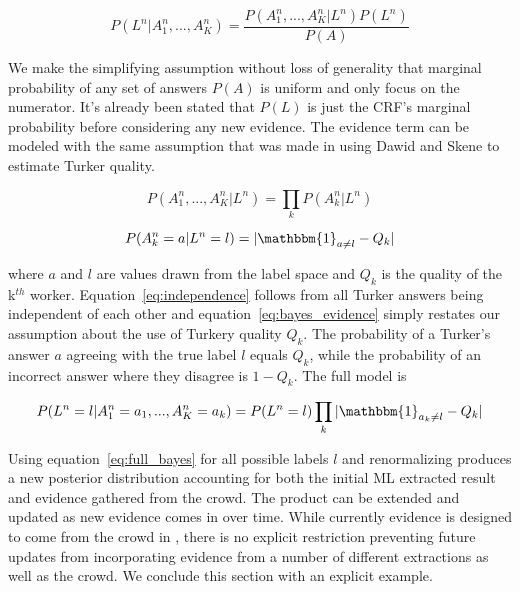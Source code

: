 \begin{equation}
P(L^{n}|A^{n}_{1},...,A^{n}_{K}) = \frac{P(A^{n}_{1},...,A^{n}_{K}|L^{n})P(L^{n})}{P(A)}
\end{equation}

We make the simplifying assumption without loss of generality that marginal probability of any set of answers $P(A)$ is uniform and only focus on the numerator.  It's already been stated that $P(L)$ is just the CRF's marginal probability before considering any new evidence.  The evidence term can be modeled with the same assumption that was made in using Dawid and Skene to estimate Turker quality.

\begin{equation}
\label{eq:independence}
P(A^{n}_{1},...,A^{n}_{K}|L^{n}) = \prod_{k}P(A^{n}_{k}|L^{n})
\end{equation}

\begin{equation}
\label{eq:bayes_evidence}
P(A^{n}_{k}=a|L^{n}=l) = |\mathbbm{1}_{{a}\neq l} - Q_{k}|
\end{equation}

where $a$ and $l$ are values drawn from the label space and $Q_{k}$ is the quality of the k$^{th}$ worker.  Equation~\ref{eq:independence} follows from all Turker answers being independent of each other and equation~\ref{eq:bayes_evidence} simply restates our assumption about the use of Turkery quality $Q_{k}$.  The probability of a Turker's answer $a$ agreeing with the true label $l$ equals $Q_{k}$, while the probability of an incorrect answer where they disagree is $1-Q_{k}$.  The full model is

\begin{equation}
\label{eq:full_bayes}
P(L^{n}=l|A^{n}_{1}=a_{1},...,A^{n}_{K}=a_{k}) = P(L^{n}=l)\prod_{k}|\mathbbm{1}_{{a_{k}}\neq l} - Q_{k}|
\end{equation}

Using equation~\ref{eq:full_bayes} for all possible labels $l$ and renormalizing produces a new posterior distribution accounting for both the initial ML extracted result and evidence gathered from the crowd.  The product can be extended and updated as new evidence comes in over time.  While currently evidence is designed to come from the crowd in \sysName , there is no explicit restriction preventing future updates from incorporating evidence from a number of different extractions as well as the crowd.  We conclude this section with an explicit example.

